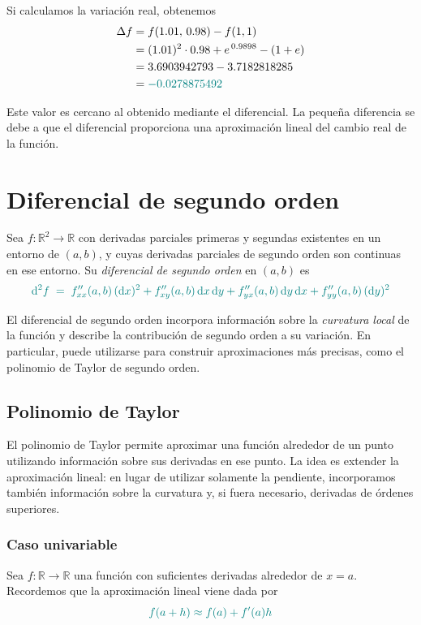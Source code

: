\documentclass{article}
\begin{document}
Si calculamos la variación real, obtenemos
\[
\begin{aligned}
\Delta f
&=
f(1.01,\,0.98)-f(1,1) \\
&=
(1.01)^2\cdot 0.98 + e^{\,0.9898} - (1+e) \\
&=
3.6903942793 - 3.7182818285 \\
&=
\color{teal}{-0.0278875492}
\end{aligned}
\]

Este valor es cercano al obtenido mediante el diferencial. La pequeña diferencia se debe a que el diferencial proporciona una aproximación lineal del cambio real de la función.


\section*{Diferencial de segundo orden}

Sea \(f:\mathbb{R}^2\to\mathbb{R}\) con derivadas parciales primeras y segundas existentes en un entorno de \((a,b)\), y cuyas derivadas parciales de segundo orden son continuas en ese entorno. Su \emph{diferencial de segundo orden} en \((a,b)\) es
\[
\color{teal}
\mathrm{d}^2f
\;=\;
f_{xx}''(a,b)\,(\mathrm{d}x)^2
+
f_{xy}''(a,b)\,\mathrm{d}x\,\mathrm{d}y
+
f_{yx}''(a,b)\,\mathrm{d}y\,\mathrm{d}x
+
f_{yy}''(a,b)\,(\mathrm{d}y)^2
\]

El diferencial de segundo orden incorpora información sobre la \emph{curvatura local} de la función y describe la contribución de segundo orden a su variación. En particular, puede utilizarse para construir aproximaciones más precisas, como el polinomio de Taylor de segundo orden.


\subsection*{Polinomio de Taylor}

El polinomio de Taylor permite aproximar una función alrededor de un punto utilizando información sobre sus derivadas en ese punto.
La idea es extender la aproximación lineal: en lugar de utilizar solamente la pendiente, incorporamos también información sobre la curvatura y, si fuera necesario, derivadas de órdenes superiores.


\subsubsection*{Caso univariable}

Sea \(f:\mathbb{R}\to\mathbb{R}\) una función con suficientes derivadas alrededor de \(x=a\).
Recordemos que la aproximación lineal viene dada por
\[
\color{teal}
f(a+h)
\approx
f(a)+f'(a)h
\]
\end{document}
